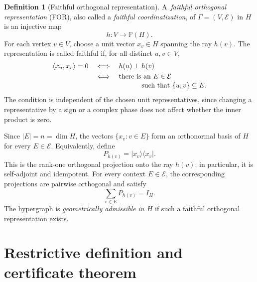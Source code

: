 \documentclass[
  twocolumn,
  aps,
  pra,
  floatfix,
  amsmath,amssymb,
  longbibliography
]{revtex4-2}
\theoremstyle{definition}
\newtheorem{definition}[theorem]{Definition}
\theoremstyle{remark}
\newcommand{\E}{\mathcal E}
\newcommand{\Pc}{\mathbb P}
\begin{document}
\begin{definition}[Faithful orthogonal representation]
A~\emph{faithful orthogonal representation} (FOR), also called a
\emph{faithful coordinatization}, of $\Gamma=(V,\E)$ in $H$ is an injective
map
\[
 h:V\to\Pc(H).
\]
For each vertex $v\in V$, choose a unit vector $x_v\in H$ spanning the ray
$h(v)$.  The representation is called faithful if, for all distinct
$u,v\in V$,
\begin{equation}
 \begin{split}
  \langle x_u,x_v\rangle=0
  &\quad\Longleftrightarrow\quad h(u)\perp h(v)\\
  &\quad\Longleftrightarrow\quad
  \text{there is an }E\in\E\\[-2pt]
  &\hspace{2.7cm}\text{such that }\{u,v\}\subseteq E.
 \end{split}
 \label{eq:faithful}
\end{equation}
The condition is independent of the chosen unit representatives, since
changing a representative by a sign or a complex phase does not affect
whether the inner product is zero.

Since $|E|=n=\dim H$, the vectors
$\{x_v:v\in E\}$ form an orthonormal basis of $H$ for every $E\in\E$.
Equivalently, define
\[
 P_{h(v)}=|x_v\rangle\langle x_v|.
\]
This is the rank-one orthogonal projection onto the ray $h(v)$; in
particular, it is self-adjoint and idempotent.  For every context
$E\in\E$, the corresponding projections are pairwise orthogonal and satisfy
\begin{equation}
 \sum_{v\in E}P_{h(v)}=I_H.
 \label{eq:projector-context}
\end{equation}
The hypergraph is \emph{geometrically admissible in $H$} if such a faithful
orthogonal representation exists.
\end{definition}

\section{Restrictive definition and certificate theorem}
\label{sec:definition}
\end{document}
